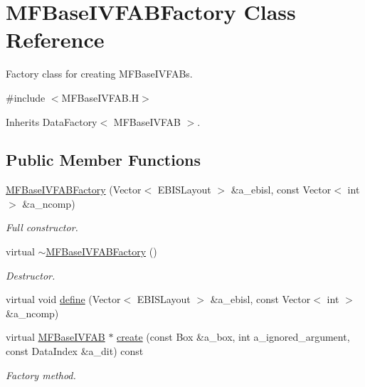 \hypertarget{classMFBaseIVFABFactory}{}\section{M\+F\+Base\+I\+V\+F\+A\+B\+Factory Class Reference}
\label{classMFBaseIVFABFactory}


Factory class for creating M\+F\+Base\+I\+V\+F\+A\+Bs.  




{\ttfamily \#include $<$M\+F\+Base\+I\+V\+F\+A\+B.\+H$>$}



Inherits Data\+Factory$<$ M\+F\+Base\+I\+V\+F\+A\+B $>$.

\subsection*{Public Member Functions}
\begin{DoxyCompactItemize}
\item 
\hyperlink{classMFBaseIVFABFactory_ad6b3c9f0a1a440896256b74fe71c3ad7}{M\+F\+Base\+I\+V\+F\+A\+B\+Factory} (Vector$<$ E\+B\+I\+S\+Layout $>$ \&a\+\_\+ebisl, const Vector$<$ int $>$ \&a\+\_\+ncomp)
\begin{DoxyCompactList}\small\item\em Full constructor. \end{DoxyCompactList}\item 
virtual \hyperlink{classMFBaseIVFABFactory_a2eaac5b5a3c969b6116025fdfe210f6a}{$\sim$\+M\+F\+Base\+I\+V\+F\+A\+B\+Factory} ()
\begin{DoxyCompactList}\small\item\em Destructor. \end{DoxyCompactList}\item 
virtual void \hyperlink{classMFBaseIVFABFactory_a5076087db31abb35e57fc2b19117c025}{define} (Vector$<$ E\+B\+I\+S\+Layout $>$ \&a\+\_\+ebisl, const Vector$<$ int $>$ \&a\+\_\+ncomp)
\item 
virtual \hyperlink{classMFBaseIVFAB}{M\+F\+Base\+I\+V\+F\+AB} $\ast$ \hyperlink{classMFBaseIVFABFactory_a74d88d587871829c73422eed8a24d207}{create} (const Box \&a\+\_\+box, int a\+\_\+ignored\+\_\+argument, const Data\+Index \&a\+\_\+dit) const 
\begin{DoxyCompactList}\small\item\em Factory method. \end{DoxyCompactList}\end{DoxyCompactItemize}
